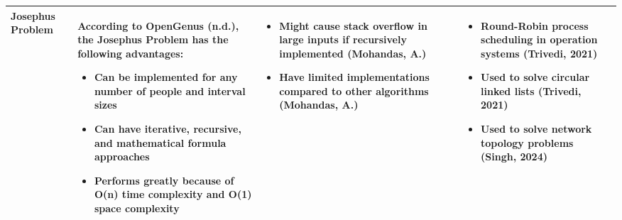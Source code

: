 \documentclass{article}
\begin{document}
\begin{longtable}{|p{2.5cm}|p{4.3cm}|p{4.3cm}|p{}|}
Josephus Problem &
According to OpenGenus (n.d.), the Josephus Problem has the following advantages:
\begin{itemize}
\itemindent=-13pt
\item Can be implemented for any number of people and interval sizes
\item Can have iterative, recursive, and mathematical formula approaches
\item Performs greatly because of O(n) time complexity and O(1) space complexity 
\end{itemize}
&
\begin{itemize}
\itemindent=-13pt
\item Might cause stack overflow in large inputs if recursively implemented (Mohandas, A.) 
\item Have limited implementations compared to other algorithms (Mohandas, A.)
\end{itemize}
&
\begin{itemize}
\itemindent=-13pt
\item Round-Robin process scheduling in operation systems (Trivedi, 2021)
\item Used to solve circular linked lists (Trivedi, 2021)
\item Used to solve network topology problems (Singh, 2024)
\end{itemize}
\\
\hline


\end{longtable}
\end{document}
